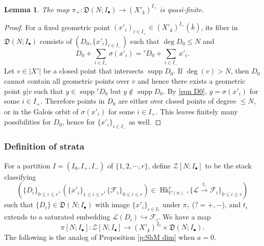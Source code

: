 \documentclass[reqno]{amsart}
\numberwithin{equation}{section}
\newcommand\mnote[1]{\marginpar{\tiny #1}}
\newcommand{\F}{\mathbf{F}}
\newcommand{\ol}[1]{\overline{#1}}
\newcommand{\inj}{\hookrightarrow}
\DeclareMathOperator{\Hk}{Hk}
\DeclareMathOperator{\supp}{supp}
\newcommand{\bu}{\bullet}
\newcommand\xr{\xrightarrow}
\newcommand{\s}{\sigma}
\renewcommand{\t}{\tau}
\newcommand\cF{\mathcal{F}}
\newcommand\cL{\mathcal{L}}
\newcommand\cZ{\mathcal{Z}}
\newcommand\frD{\mathfrak{D}}
\newtheorem{lemma}[thm]{Lemma}
\theoremstyle{remark}
\numberwithin{equation}{section}
\begin{document}
\begin{lemma}\label{l:dim D}
The map $\pi_{+}: \frD(N;I_{\bu})\to (X'_{\ol{k}})^{I_{+}}$ is quasi-finite.
\end{lemma}
\begin{proof}
For a fixed geometric point $(x'_{i})_{i\in I_{+}} \in (X'_{\ol{k}})^{I_{+}}(\ol{k})$, its fiber in $\frD(N;I_{\bu})$ consists of $(D_{0}, \{x'_{i}\}_{i\in I_{-}})$ such that $\deg D_{0}\le N$ and 
\begin{equation}\label{eqn D0}
D_{0}+\sum_{i\in I_{+}} \s(x'_{i})={}^{\t}D_{0}+\sum_{i\in I_{-}} x'_{i}.
\end{equation}
Let $v\in |X'|$ be a closed point that intersects $\supp D_{0}$. If $\deg(v)>N$, then $D_{0}$ cannot contain all geometric points over $v$ and hence there exists a geometric point $y|v$ such that $y\in \supp {}^{\t}D_{0}$ but $y\notin \supp D_{0}$. By \eqref{eqn D0}, $y=\s(x'_{i})$ for some $i\in I_{+}$.  Therefore points in $D_{0}$ are either over closed points of degree $\le N$, or in the Galois orbit of $\s(x'_{i})$ for some $i\in I_{+}$. This leaves finitely many possibilities for $D_{0}$, hence for $\{x'_{i}\}_{i\in I_{-}}$ as well.
\end{proof}





\subsubsection{Definition of strata} For a partition $I=(I_{0},I_{+},I_{-})$ of $\{1,2,\cdots, r\}$, define $\cZ[N;I_{\bu}]$ to be the stack classifying 
\[
(\{D_{i}\}_{0\le i\le r},( \{x'_{i}\}_{1\le i\le r}, \{\cF_{i}\}_{0\le i\le r})\in \Hk^{r}_{U(n)}, \{\cL\xr{t_{i}}\cF_{i}\}_{0\le i\le r})
\]
such that $\{D_{i}\}\in \frD(N;I_{\bu})$ with image $\{x'_{i}\}_{i\in I_{?}}$ under $\pi_{?}$ ($?=+,-$), and $t_{i}$ extends to a saturated embedding $\cL(D_{i})\inj \cF_{i}$. We have a map
\begin{equation}
\pi[N;I_{\bu}]: \cZ[N;I_{\bu}]\to (X'_{\ol{k}})^{I_{0}}\times \frD(N;I_{\bu}).
\end{equation}
The following is the analog of Proposition \ref{p:ShM dim} when $a=0$.
\end{document}

